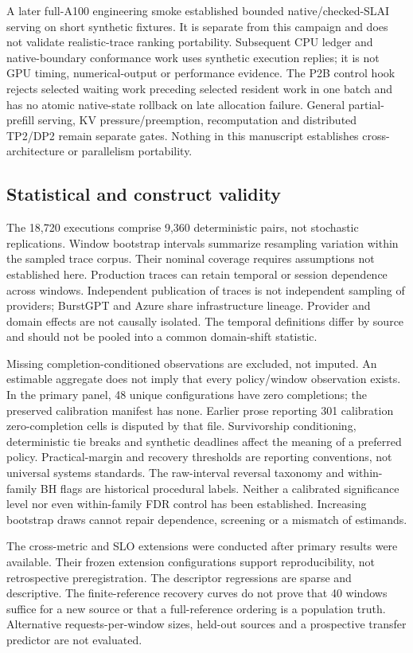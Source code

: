 A later full-A100 engineering smoke established bounded native/checked-SLAI
serving on short synthetic fixtures. It is separate from this campaign and
does not validate realistic-trace ranking portability. Subsequent CPU ledger
and native-boundary conformance work uses synthetic execution replies;
it is not GPU timing, numerical-output or performance evidence. The P2B
control hook rejects selected waiting work preceding selected resident
work in one batch and has no atomic native-state rollback on late allocation
failure. General partial-prefill serving, KV pressure/preemption,
recomputation and distributed TP2/DP2 remain separate gates. Nothing in
this manuscript establishes cross-architecture or parallelism portability.

\subsection{Statistical and construct validity}
The 18,720 executions comprise 9,360 deterministic pairs, not stochastic
replications. Window bootstrap intervals summarize resampling variation within the
sampled trace corpus. Their nominal coverage requires assumptions not
established here. Production
traces can retain temporal or session dependence across windows. Independent
publication of traces is not independent sampling of providers; BurstGPT and
Azure share infrastructure lineage. Provider and domain effects are not
causally isolated. The temporal definitions differ by source and should
not be pooled into a common domain-shift statistic.

Missing completion-conditioned observations are excluded, not imputed.
An estimable aggregate does not imply that every policy/window observation
exists. In the primary panel, 48 unique configurations have zero completions;
the preserved calibration manifest has none. Earlier prose reporting 301 calibration zero-completion cells is disputed by that file. Survivorship
conditioning, deterministic tie breaks and synthetic deadlines affect the
meaning of a preferred policy. Practical-margin and recovery thresholds
are reporting conventions, not universal systems standards. The raw-interval
reversal taxonomy and within-family BH flags are historical procedural
labels. Neither a calibrated significance level nor even within-family
FDR control has been established. Increasing bootstrap draws cannot
repair dependence, screening or a mismatch of estimands.

The cross-metric and SLO extensions were conducted after primary results
were available. Their frozen extension configurations support reproducibility,
not retrospective preregistration. The descriptor regressions are sparse
and descriptive. The finite-reference recovery curves do not prove that
40 windows suffice for a new source or that a full-reference ordering is a
population truth. Alternative requests-per-window sizes, held-out sources
and a prospective transfer predictor are not evaluated.

